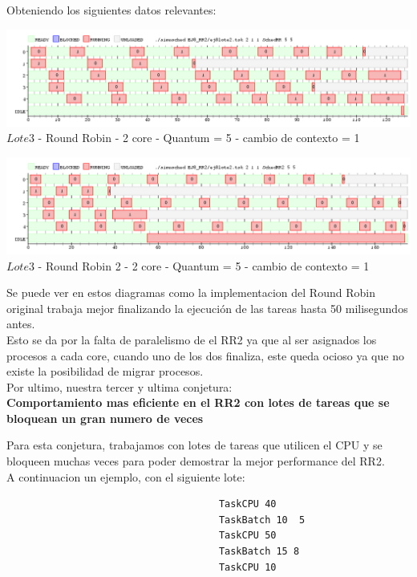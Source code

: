 Obteniendo los siguientes datos relevantes:\\

\begin{center}
    	\includegraphics[width=450pt]{./EJ8_RR2/dif10corerr.png}
	{$Lote 3$ - Round Robin - 2 core - Quantum = 5 - cambio de contexto = 1}	
 \end{center}
 
 \begin{center}
    	\includegraphics[width=450pt]{./EJ8_RR2/dif10corerr2.png}
	{$Lote 3$ - Round Robin 2 - 2 core - Quantum = 5 - cambio de contexto = 1}	
 \end{center}
 
 Se puede ver en estos diagramas como la implementacion del Round Robin original trabaja
 mejor finalizando la ejecución de las tareas hasta 50 milisegundos antes.\\
 Esto se da por la falta de paralelismo de el RR2 ya que al ser asignados los procesos
 a cada core, cuando uno de los dos finaliza, este queda ocioso ya que no existe la
 posibilidad de migrar  procesos.\\
 
 Por ultimo, nuestra tercer y ultima conjetura:\\
 
 \textbf{Comportamiento mas eficiente en el RR2 con lotes de tareas que se bloquean un gran numero
de veces}

Para esta conjetura, trabajamos con lotes de tareas que utilicen el CPU y se bloqueen muchas
veces para poder demostrar la mejor performance del RR2.\\

A continuacion un ejemplo, con el siguiente lote:

\begin{verbatim}
                                     TaskCPU 40
                                     TaskBatch 10  5
                                     TaskCPU 50
                                     TaskBatch 15 8
                                     TaskCPU 10

\end{verbatim}


